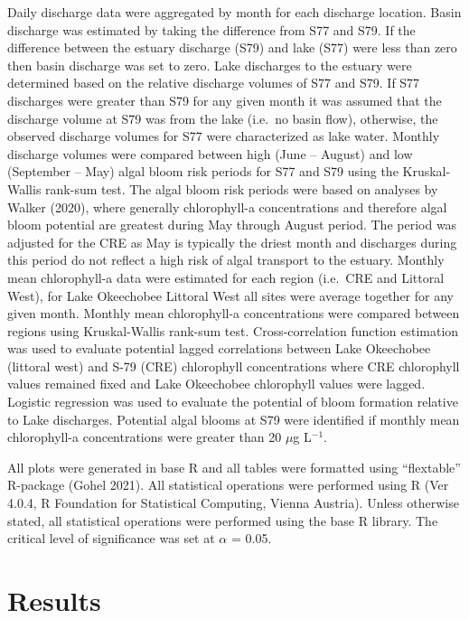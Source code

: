 \documentclass[]{interact}
\theoremstyle{plain}%
\theoremstyle{definition}
\theoremstyle{remark}
\begin{document}
Daily discharge data were aggregated by month for each discharge
location. Basin discharge was estimated by taking the difference from
S77 and S79. If the difference between the estuary discharge (S79) and
lake (S77) were less than zero then basin discharge was set to zero.
Lake discharges to the estuary were determined based on the relative
discharge volumes of S77 and S79. If S77 discharges were greater than
S79 for any given month it was assumed that the discharge volume at S79
was from the lake (i.e.~no basin flow), otherwise, the observed
discharge volumes for S77 were characterized as lake water. Monthly
discharge volumes were compared between high (June -- August) and low
(September -- May) algal bloom risk periods for S77 and S79 using the
Kruskal-Wallis rank-sum test. The algal bloom risk periods were based on
analyses by Walker (2020), where generally chlorophyll-a concentrations
and therefore algal bloom potential are greatest during May through
August period. The period was adjusted for the CRE as May is typically
the driest month and discharges during this period do not reflect a high
risk of algal transport to the estuary. Monthly mean chlorophyll-a data
were estimated for each region (i.e.~CRE and Littoral West), for Lake
Okeechobee Littoral West all sites were average together for any given
month. Monthly mean chlorophyll-a concentrations were compared between
regions using Kruskal-Wallis rank-sum test. Cross-correlation function
estimation was used to evaluate potential lagged correlations between
Lake Okeechobee (littoral west) and S-79 (CRE) chlorophyll
concentrations where CRE chlorophyll values remained fixed and Lake
Okeechobee chlorophyll values were lagged. Logistic regression was used
to evaluate the potential of bloom formation relative to Lake
discharges. Potential algal blooms at S79 were identified if monthly
mean chlorophyll-a concentrations were greater than 20 \(\mu\)g
L\(^{-1}\).

All plots were generated in base R and all tables were formatted using
``flextable'' R-package (Gohel 2021). All statistical operations were
performed using R (Ver 4.0.4, R Foundation for Statistical Computing,
Vienna Austria). Unless otherwise stated, all statistical operations
were performed using the base R library. The critical level of
significance was set at \(\alpha\) = 0.05.

\hypertarget{results}{%
\section{Results}\label{results}}
\end{document}
